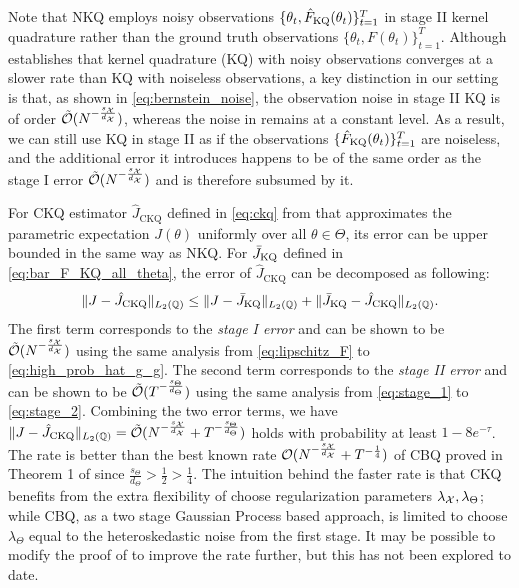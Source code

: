 \begin{rem}\label{rem:noise_stage_2}
    Note that NKQ employs noisy observations $\{\theta_t, \hat{F}_{\text{KQ}}(\theta_t)\}_{t=1}^T$ in stage II kernel quadrature rather than the ground truth observations $\{\theta_t, F(\theta_t)\}_{t=1}^T$. 
    Although \citet{Cai2023} establishes that kernel quadrature (KQ) with noisy observations converges at a slower rate than KQ with noiseless observations, a key distinction in our setting is that, as shown in \eqref{eq:bernstein_noise}, the observation noise in stage II KQ is of order $\tilde{\mathcal{O}}(N^{-\frac{s_{\mathcal{X}}}{d_{\mathcal{X}}}})$, whereas the noise in \citet{Cai2023} remains at a constant level.
    As a result, we can still use KQ in stage II as if the observations $\{\hat{F}_{\text{KQ}}(\theta_t)\}_{t=1}^T$ are noiseless, and the additional error it introduces happens to be of the same order as the stage I error $\tilde{\mathcal{O}}(N^{-\frac{s_{\mathcal{X}}}{d_{\mathcal{X}}}})$ and is therefore subsumed by it.
\end{rem}

\begin{rem}\label{rem:ckq_rate}
    For CKQ estimator $\hat{J}_{\text{CKQ}}$ defined in \eqref{eq:ckq} from  that approximates the parametric expectation $J(\theta)$ uniformly over all $\theta \in \Theta$, its error can be upper bounded in the same way as NKQ. For $\bar{J}_{\text{KQ}}$ defined in \eqref{eq:bar_F_KQ_all_theta}, the error of $\hat{J}_{\text{CKQ}}$ can be decomposed as following:
    \begin{align*}
        \| J - \hat{J}_{\text{CKQ}} \|_{L_2(\mathbb{Q})} \leq \| J - \bar{J}_{\text{KQ}} \|_{L_2(\mathbb{Q})} + \| \bar{J}_{\text{KQ}} - \hat{J}_{\text{CKQ}} \|_{L_2(\mathbb{Q})}.
    \end{align*}
    The first term corresponds to the \emph{stage I error} and can be shown to be $\tilde{\mathcal{O}}(N^{-\frac{s_{\mathcal{X}}}{d_{\mathcal{X}}}})$ using the same analysis from \eqref{eq:lipschitz_F} to \eqref{eq:high_prob_hat_g_g}. The second term corresponds to the \emph{stage II error} and can be shown to be $\tilde{\mathcal{O}}(T^{-\frac{s_\Theta}{d_\Theta}})$ using the same analysis from \eqref{eq:stage_1} to \eqref{eq:stage_2}. 
    Combining the two error terms, we have $\| J - \hat{J}_{\text{CKQ}} \|_{L_2(\mathbb{Q})} = \tilde{\mathcal{O}}(N^{-\frac{s_{\mathcal{X}}}{d_{\mathcal{X}}}} + T^{-\frac{s_\Theta}{d_\Theta}})$ holds with probability at least $1 - 8 e^{-\tau}$.
    The rate is better than the best known rate $\mathcal{O}(N^{-\frac{s_{\mathcal{X}}}{d_{\mathcal{X}}}} + T^{-\frac{1}{4}})$ of CBQ proved in Theorem 1 of \cite{chen2024conditional} since $\frac{s_\Theta}{d_\Theta} > \frac{1}{2} > \frac{1}{4}$.
    The intuition behind the faster rate is that CKQ benefits from the extra flexibility of choose regularization parameters $\lambda_{\mathcal{X}}, \lambda_\Theta$; while CBQ, as a two stage Gaussian Process based approach, is limited to choose $\lambda_\Theta$ equal to the heteroskedastic noise from the first stage. It may be possible to modify the proof of \cite{chen2024conditional} to improve the rate further, but this has not been explored to date.
\end{rem}


